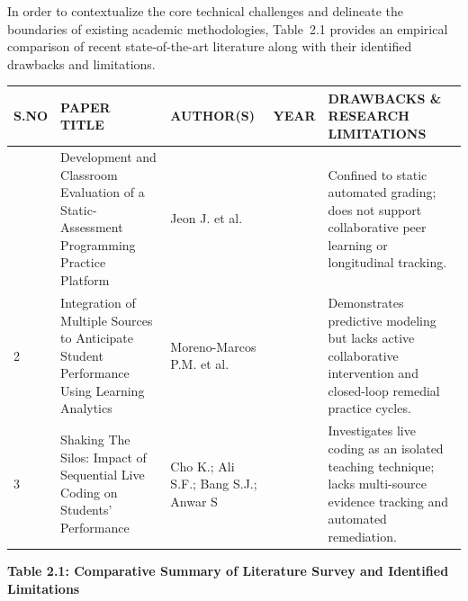 {\fontsize{11.5pt}{16.5pt}\selectfont
\noindent In order to contextualize the core technical challenges and delineate the boundaries of existing academic methodologies, Table~2.1 provides an empirical comparison of recent state-of-the-art literature along with their identified drawbacks and limitations.

\vspace{0.15cm}
\begin{table}[H]
  \centering
  \renewcommand{\arraystretch}{1.35}
  \fontsize{9pt}{12.5pt}\selectfont
  \begin{tabular}{|>{\centering\arraybackslash}m{0.9cm}|>{\raggedright\arraybackslash}m{3.6cm}|>{\centering\arraybackslash}m{2.3cm}|>{\centering\arraybackslash}m{1.1cm}|>{\raggedright\arraybackslash}m{5.7cm}|}
    \hline
    \rowcolor{black!10}
    \textbf{S.NO} & \centering\textbf{PAPER TITLE} & \textbf{AUTHOR(S)} & \textbf{YEAR} & \centering\textbf{DRAWBACKS \& RESEARCH LIMITATIONS} \tabularnewline
    \hline
    1 & Development and Classroom Evaluation of a Static-Assessment Programming Practice Platform 
      & Jeon J. et al. 
      & 2026 
      & Confined to static automated grading; does not support collaborative peer learning or longitudinal tracking. \tabularnewline
    \hline
    2 & Integration of Multiple Sources to Anticipate Student Performance Using Learning Analytics 
      & Moreno-Marcos P.M. et al. 
      & 2025 
      & Demonstrates predictive modeling but lacks active collaborative intervention and closed-loop remedial practice cycles. \tabularnewline
    \hline
    3 & Shaking The Silos: Impact of Sequential Live Coding on Students' Performance 
      & Cho K.; Ali S.F.; Bang S.J.; Anwar S 
      & 2024 
      & Investigates live coding as an isolated teaching technique; lacks multi-source evidence tracking and automated remediation. \tabularnewline
    \hline
  \end{tabular}\par
  \vspace{10pt}
  {\centering\fontsize{10pt}{14pt}\selectfont\bfseries Table 2.1: Comparative Summary of Literature Survey and Identified Limitations\par}
\end{table}

}
